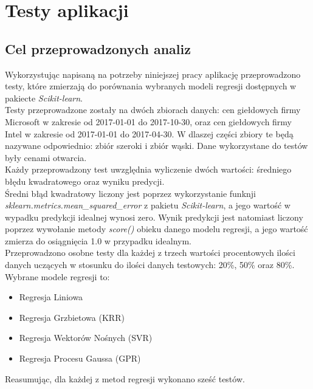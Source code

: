 
\chapter{Testy aplikacji}

\section{Cel przeprowadzonych analiz}

Wykorzystując napisaną na potrzeby niniejszej pracy aplikację przeprowadzono testy, które zmierzają do porównania wybranych modeli regresji dostępnych w pakiecte \textit{Scikit-learn}.\\

Testy przeprowadzone zostały na dwóch zbiorach danych: cen giełdowych firmy Microsoft w zakresie od 2017-01-01 do 2017-10-30, oraz cen giełdowych firmy Intel w zakresie od 2017-01-01 do 2017-04-30.
W dlaszej części zbiory te będą nazywane odpowiednio: zbiór szeroki i zbiór wąski.
Dane wykorzystane do testów były cenami otwarcia.\\

Każdy przeprowadzony test uwzględnia wyliczenie dwóch wartości: średniego błędu kwadratowego oraz wyniku predycji.\\

Średni błąd kwadratowy liczony jest poprzez wykorzystanie funknji \textit{sklearn.metrics.mean\_squared\_error} z pakietu \textit{Scikit-learn}, a jego wartość w wypadku predykcji idealnej wynosi zero.
Wynik predykcji jest natomiast liczony poprzez wywołanie metody \textit{score()} obieku danego modelu regresji, a jego wartość zmierza do osiągnięcia 1.0 w przypadku idealnym.\\

Przeprowadzono osobne testy dla każdej z trzech wartości procentowych ilości danych uczących w stosunku do ilości danych testowych: 20\%, 50\% oraz 80\%.\\

Wybrane modele regresji to:
\begin{itemize}
 \item Regresja Liniowa
 \item Regresja Grzbietowa (KRR)
 \item Regresja Wektorów Nośnych (SVR)
 \item Regresja Procesu Gaussa (GPR)
\end{itemize}

Reasumując, dla każdej z metod regresji wykonano sześć testów.\\

